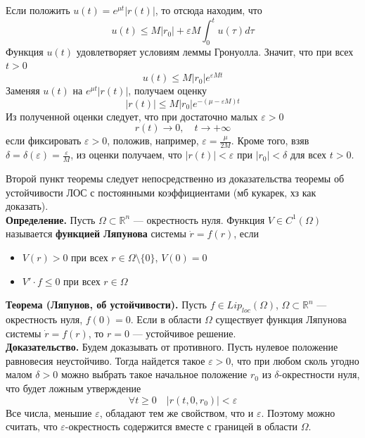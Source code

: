 Если положить $u(t) = e^{\mu t}|r(t)|$, то отсюда находим, что
\begin{equation*}
    u(t) \le M |r_0| + \varepsilon M\int_0^t u(\tau)d\tau
\end{equation*}
Функция $u(t)$ удовлетворяет условиям леммы Гронуолла. Значит, что при всех $t > 0$
\begin{equation*}
    u(t) \le M |r_0|e^{\varepsilon Mt}
\end{equation*}
Заменяя $u(t)$ на $e^{\mu t} |r(t)|$, получаем оценку
\begin{equation*}
    |r(t)| \le M |r_0|e^{-(\mu - \varepsilon M)t}
\end{equation*}
Из полученной оценки следует, что при достаточно малых $\varepsilon > 0$
\begin{equation*}
    r(t) \to 0, \quad t \to +\infty
\end{equation*}
если фиксировать $\varepsilon > 0$, положив, например, $\varepsilon = \frac{\mu}{2M}$. Кроме того, взяв $\delta = \delta(\varepsilon) = \frac{\varepsilon}{M}$, из оценки получаем, что $|r(t)| < \varepsilon$ при $|r_0| < \delta$ для всех $t > 0$.

Второй пункт теоремы следует непосредственно из доказательства теоремы об устойчивости ЛОС с постоянными коэффициентами (мб кукарек, хз как доказать).\\

\noindent \textbf{Определение.} Пусть $\Omega \subset \mathbb{R}^n$ --- окрестность нуля. Функция $V \in C^1(\Omega)$ называется \textbf{функцией Ляпунова} системы $\dot{r} = f(r)$, если
\begin{itemize}
    \item $V(r) > 0$ при всех $r \in \Omega \setminus \{0\}$, $V(0) = 0$
    \item $V' \cdot f \le 0$ при всех $r \in \Omega$
\end{itemize}

\noindent \textbf{Теорема (Ляпунов, об устойчивости).} Пусть $f \in Lip_{loc}(\Omega)$, $\Omega \subset \mathbb{R}^n$ --- окрестность нуля, $f(0) = 0$. Если в области $\Omega$ существует функция Ляпунова системы $\dot{r} = f(r)$, то $r = 0$ --- устойчивое решение.\\

\noindent \textbf{Доказательство.} Будем доказывать от противного. Пусть нулевое положение равновесия неустойчиво. Тогда найдется такое $\varepsilon > 0$, что при любом сколь угодно малом $\delta > 0$ можно выбрать такое начальное положение $r_0$ из $\delta$-окрестности нуля, что будет ложным утверждение
\begin{equation}
    \forall t \ge 0 \quad |r(t, 0, r_0)| < \varepsilon \label{lyap}
\end{equation}
Все числа, меньшие $\varepsilon$, обладают тем же свойством, что и $\varepsilon$. Поэтому можно считать, что $\varepsilon$-окрестность содержится вместе с границей в области $\Omega$.

